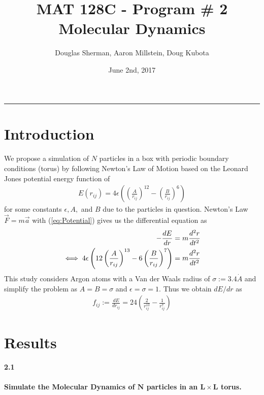 \documentclass[11.5pt]{article}
\newcommand{\Frac}[2]{\left(\frac{#1}{#2}\right)}
\newcommand{\mbf}[1]{\mathbf{#1}}
\begin{document}
\title{MAT 128C - Program \# 2 Molecular Dynamics}
\author{Douglas Sherman, Aaron Millstein, Doug Kubota}
\date{June 2nd, 2017}
\maketitle
\rule{\textwidth}{1pt}
\lstset{style=small} %

\section{Introduction}
\paragraph{}
We propose a simulation of $N$ particles in a box with periodic boundary conditions (torus) by following Newton's Law of Motion based on the Leonard Jones potential energy function of
\begin{align} \label{eq:Potential}
E(r_{ij}) = 4\epsilon \left( \Frac{A}{r_{ij}}^12 - \Frac{B}{r_{ij}}^6\right) 
\end{align}
for some constants $\epsilon,A,$ and $B$ due to the particles in question. Newton's Law $\vec{F}=m\vec{a}$ with (\ref{eq:Potential}) gives us the differential equation as
\begin{align} \label{eg:FMA}
-\frac{dE}{dr}&=m\frac{d^2r}{dt^2}\notag \\ 
\iff 4\epsilon\left( 12\Frac{A}{r_{ij}}^{13} - 6\Frac{B}{r_{ij}}^7\right) &= m \frac{d^2r}{dt^2}
\end{align}
This study considers Argon atoms with a Van der Waals radius of $\sigma := 3.4 \dot{A}$ and simplify the problem as $A= B = \sigma$ and $\epsilon = \sigma = 1$. Thus we obtain $dE/dr$ as 
\begin{align*}
f_{ij}:= \frac{dE}{dr_{ij}} = 24\left(\frac{2}{r_{ij}^{13}} - \frac{1}{r_{ij}^7}\right)
\end{align*}

\section{Results}
\paragraph{2.1}\textbf{Simulate the Molecular Dynamics of $\mbf{N}$ particles in an $\mbf{L\times L}$ torus.}\\
\end{document}
